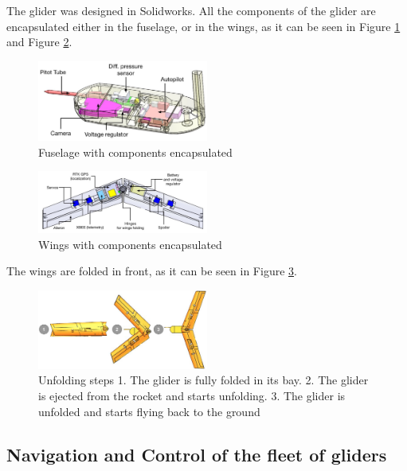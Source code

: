 The glider was designed in Solidworks. All the components of the glider are encapsulated either in the fuselage, or in the wings, as it can be seen in Figure \ref{f:fuseg} and Figure  \ref{f:wings}.


\begin{figure}[h!]
    \centering
        \includegraphics[width=0.5\textwidth]{img/fuselage.jpg}
        \caption{Fuselage with components encapsulated}
        \label{f:fuseg}
 \end{figure}

\begin{figure}[h!]
    \centering
        \includegraphics[width=0.5\textwidth]{img/wings.jpg}
        \caption{Wings with components encapsulated}
        \label{f:wings}
 \end{figure}


The wings are folded in front, as it can be seen in Figure \ref{f:folding}.

\begin{figure}[h!]
    \centering
        \includegraphics[width=0.5\textwidth]{img/folding.png}
        \caption{Unfolding steps 1. The glider is fully folded in its bay. 2. The glider is ejected from the rocket and starts unfolding. 3. The glider is unfolded and starts flying back to the ground}
        \label{f:folding}
 \end{figure}

\subsection{Navigation and Control of the fleet of gliders}
\label{subsection:navcontrol}

